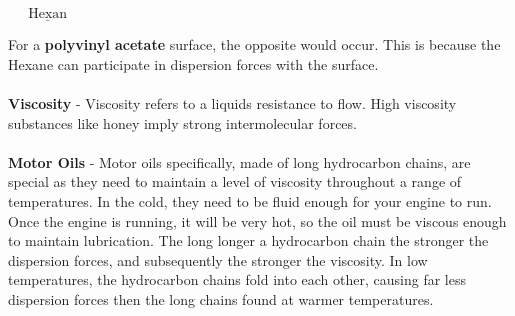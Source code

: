 \documentclass{article}
\begin{document}
\begin{qq}
\begin{center}
\begin{minipage}{7cm}
	\begin{center}
		$\quad\:\:\underline{\text{Hexan}}$
	\end{center}		
\end{minipage}


\end{center}

\end{qq}
	\noindent For a \textbf{polyvinyl acetate} surface, the opposite would occur. This is because the Hexane can participate in dispersion forces with the surface. \\
	\\
	\textbf{Viscosity} - Viscosity refers to a liquids resistance to flow. High viscosity substances like honey imply strong intermolecular forces. \\
	\\
	\textbf{Motor Oils } - Motor oils specifically, made of long hydrocarbon chains, are special as they need to maintain a level of viscosity throughout a range of temperatures. In the cold, they need to be fluid enough for your engine to run. Once the engine is running, it will be very hot, so the oil must be viscous enough to maintain lubrication. The long longer a hydrocarbon chain the stronger the dispersion forces, and subsequently the stronger the viscosity. In low temperatures, the hydrocarbon chains fold into each other, causing far less dispersion forces then the long chains found at warmer temperatures.\\
\end{document}
